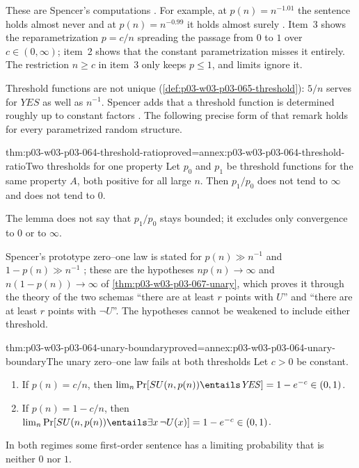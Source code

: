 These are Spencer's computations
\cite[pp.~1--2]{Spencer2007LogicRandomStructuresAuthor}.  For example, at
\(p(n)=n^{-1.01}\) the sentence holds almost never and at \(p(n)=n^{-0.99}\)
it holds almost surely \cite[p.~2]{Spencer2007LogicRandomStructuresAuthor}.
Item~3 shows the reparametrization \(p=c/n\) spreading the passage from
\(0\) to \(1\) over \(c\in(0,\infty)\); item~2 shows that the constant
parametrization misses it entirely.  The restriction \(n\geq c\) in item~3
only keeps \(p\leq1\), and limits ignore it.

Threshold functions are not unique (\cref{def:p03-w03-p03-065-threshold}):
\(5/n\) serves for \(\mathit{YES}\) as well as \(n^{-1}\).  Spencer adds that
a threshold function is determined roughly up to constant factors
\cite[p.~2]{Spencer2007LogicRandomStructuresAuthor}.  The following precise
form of that remark holds for every parametrized random structure.

\begin{hblemma}{thm:p03-w03-p03-064-threshold-ratio}{proved=annex:p03-w03-p03-064-threshold-ratio}{Two thresholds for one property}
Let \(p_0\) and \(p_1\) be threshold functions for the same property \(A\),
both positive for all large \(n\).  Then \(p_1/p_0\) does not tend to
\(\infty\) and does not tend to \(0\).
\end{hblemma}

The lemma does not say that \(p_1/p_0\) stays bounded; it excludes only
convergence to \(0\) or to \(\infty\).

Spencer's prototype zero--one law is stated for \(p(n)\gg n^{-1}\) and
\(1-p(n)\gg n^{-1}\) \cite[p.~3]{Spencer2007LogicRandomStructuresAuthor};
these are the hypotheses \(np(n)\to\infty\) and \(n(1-p(n))\to\infty\) of
\cref{thm:p03-w03-p03-067-unary}, which proves it through the theory of the
two schemas ``there are at least \(r\) points with \(U\)'' and ``there are at
least \(r\) points with \(\neg U\)''.  The hypotheses cannot be weakened to
include either threshold.

\begin{hbtheorem}{thm:p03-w03-p03-064-unary-boundary}{proved=annex:p03-w03-p03-064-unary-boundary}{The unary zero--one law fails at both thresholds}
Let \(c>0\) be constant.
\begin{enumerate}
\item If \(p(n)=c/n\), then
  \(\lim_n\Pr[SU(n,p(n))\entails\mathit{YES}]=1-e^{-c}\in(0,1)\).
\item If \(p(n)=1-c/n\), then
  \(\lim_n\Pr[SU(n,p(n))\entails\exists x\,\neg U(x)]=1-e^{-c}\in(0,1)\).
\end{enumerate}
In both regimes some first-order sentence has a limiting probability that is
neither \(0\) nor \(1\).
\end{hbtheorem}

